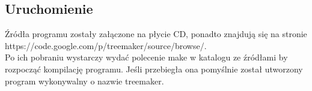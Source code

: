 \subsection{Uruchomienie}
Źródła programu zostały załączone na płycie CD, ponadto znajdują się na stronie https://code.google.com/p/treemaker/source/browse/.\\
Po ich pobraniu wystarczy wydać polecenie make w katalogu ze źródłami by rozpocząć kompilację programu. Jeśli przebiegła ona pomyślnie został utworzony
program wykonywalny o nazwie treemaker.
